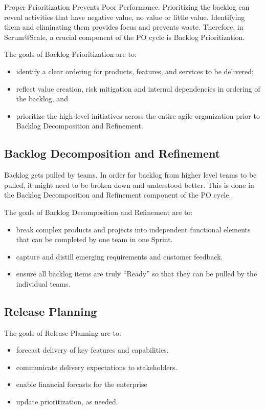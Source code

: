 \documentclass[12pt,a4paper,parskip=full]{scrartcl}
\begin{document}
Proper Prioritization Prevents Poor Performance.
Prioritizing the backlog can reveal activities that have negative value, no value or little value.
Identifying them and eliminating them provides focus and prevents waste.
Therefore, in Scrum@Scale, a crucial component of the PO cycle is Backlog Prioritization.

The goals of Backlog Prioritization are to:

\begin{itemize}
	\item identify a clear ordering for products, features, and services to be delivered;
	\item reflect value creation, risk mitigation and internal dependencies in ordering of the backlog, and
	\item prioritize the high-level initiatives across the entire agile organization prior to Backlog Decomposition and Refinement.
\end{itemize}

\subsection{Backlog Decomposition and Refinement}

Backlog gets pulled by teams.
In order for backlog from higher level teams to be pulled, it might need to be broken down and understood better.
This is done in the Backlog Decomposition and Refinement component of the PO cycle.

The goals of Backlog Decomposition and Refinement are to:

\begin{itemize}
	\item break complex products and projects into independent functional elements that can be completed by one team in one Sprint.
	\item capture and distill emerging requirements and customer feedback.
	\item ensure all backlog items are truly ``Ready'' so that they can be pulled by the individual teams.
\end{itemize}

\subsection{Release Planning}

The goals of Release Planning are to:

\begin{itemize}
	\item forecast delivery of key features and capabilities.
	\item communicate delivery expectations to stakeholders.
	\item enable financial forcasts for the enterprise
	\item update prioritization, as needed.
\end{itemize}
\end{document}
